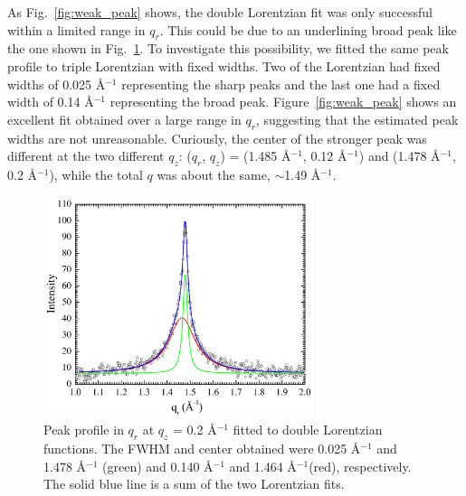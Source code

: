 As Fig.~\ref{fig:weak_peak}
shows, the double Lorentzian fit was only successful within a limited range
in $q_r$. This could be due to an underlining broad peak like the one
shown in Fig.~\ref{fig:strong_peak}. To investigate this possibility,
we fitted the same peak profile to triple Lorentzian with fixed widths.
Two of the Lorentzian had fixed widths of 0.025 \AA$^{-1}$ representing 
the sharp peaks and the last one had a fixed width of 0.14 \AA$^{-1}$
representing the broad peak. Figure~\ref{fig:weak_peak} shows an excellent
fit obtained over a large range in $q_r$, suggesting that the estimated
peak widths are not unreasonable.
Curiously, the center of the stronger peak was different at the two 
different $q_z$: ($q_r$, $q_z$) = (1.485 \AA$^{-1}$, 0.12 \AA$^{-1}$)
and (1.478 \AA$^{-1}$, 0.2 \AA$^{-1}$), while the total $q$ was about
the same, $\sim$1.49 \AA$^{-1}$.

\begin{figure}[htbp]
  \centering
  \includegraphics[width=0.7\textwidth]{figures/ripple/nGIWAXS/strong_peak_Lorentz}
  \caption[Peak profile in $q_r$ at $q_z$ = 0.2 \AA$^{-1}$ 
  fitted to double Lorentzian functions]{Peak profile in $q_r$ at $q_z$ = 0.2 \AA$^{-1}$ 
  fitted to double Lorentzian functions. The FWHM and center obtained 
  were 0.025 \AA$^{-1}$ and 1.478 \AA$^{-1}$ (green) and 0.140 \AA$^{-1}$ 
  and 1.464 \AA$^{-1}$(red), respectively. The solid blue line is a sum
  of the two Lorentzian fits.}
  \label{fig:strong_peak}
\end{figure}

